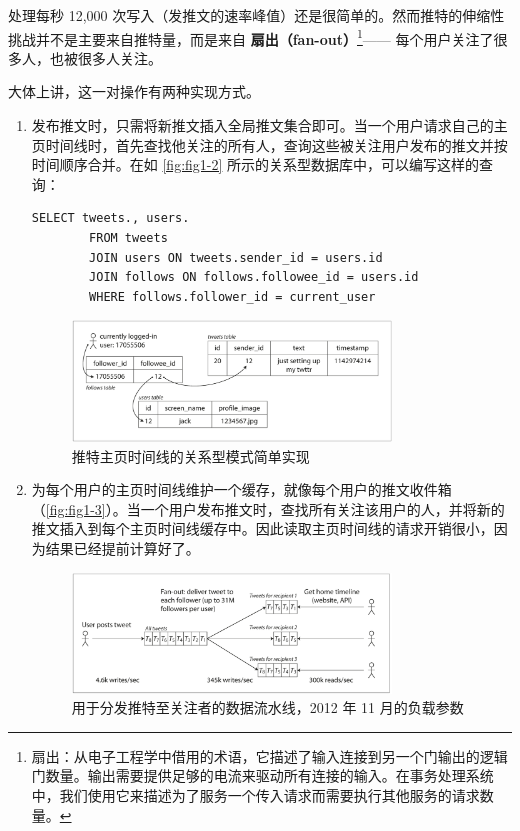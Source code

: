 处理每秒 12,000 次写入（发推文的速率峰值）还是很简单的。然而推特的伸缩性挑战并不是主要来自推特量，而是来自 \textbf{扇出（fan-out）}\footnote{扇出：从电子工程学中借用的术语，它描述了输入连接到另一个门输出的逻辑门数量。输出需要提供足够的电流来驱动所有连接的输入。在事务处理系统中，我们使用它来描述为了服务一个传入请求而需要执行其他服务的请求数量。}—— 每个用户关注了很多人，也被很多人关注。

大体上讲，这一对操作有两种实现方式。

\begin{enumerate}
  \item 发布推文时，只需将新推文插入全局推文集合即可。当一个用户请求自己的主页时间线时，首先查找他关注的所有人，查询这些被关注用户发布的推文并按时间顺序合并。在如 \autoref{fig:fig1-2} 所示的关系型数据库中，可以编写这样的查询：
        \begin{lstlisting}[breaklines=true]
        SELECT tweets., users.
        FROM tweets
        JOIN users ON tweets.sender_id = users.id
        JOIN follows ON follows.followee_id = users.id
        WHERE follows.follower_id = current_user
        \end{lstlisting}
        \begin{figure}
          \centering
          \includegraphics[width=0.8\textwidth]{img/fig1-2.png}
          \caption{推特主页时间线的关系型模式简单实现}
          \label{fig:fig1-2}
        \end{figure}
  \item 为每个用户的主页时间线维护一个缓存，就像每个用户的推文收件箱（\autoref{fig:fig1-3}）。当一个用户发布推文时，查找所有关注该用户的人，并将新的推文插入到每个主页时间线缓存中。因此读取主页时间线的请求开销很小，因为结果已经提前计算好了。
        \begin{figure}[htbp]
          \centering
          \includegraphics[width=0.8\textwidth]{img/fig1-3.png}
          \caption{用于分发推特至关注者的数据流水线，2012 年 11 月的负载参数\cite{krikorian2012}}
          \label{fig:fig1-3}
        \end{figure}
\end{enumerate}

